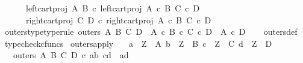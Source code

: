 \begin{isabellebody}
\ \ \ \ \ \ left{\isacharunderscore}{\kern0pt}cart{\isacharunderscore}{\kern0pt}proj\ A\ B\ {\isasymcirc}\isactrlsub c\ left{\isacharunderscore}{\kern0pt}cart{\isacharunderscore}{\kern0pt}proj\ {\isacharparenleft}{\kern0pt}A\ {\isasymtimes}\isactrlsub c\ B{\isacharparenright}{\kern0pt}\ {\isacharparenleft}{\kern0pt}C\ {\isasymtimes}\isactrlsub c\ D{\isacharparenright}{\kern0pt}{\isacharcomma}{\kern0pt}\isanewline
\ \ \ \ \ \ right{\isacharunderscore}{\kern0pt}cart{\isacharunderscore}{\kern0pt}proj\ C\ D\ {\isasymcirc}\isactrlsub c\ right{\isacharunderscore}{\kern0pt}cart{\isacharunderscore}{\kern0pt}proj\ {\isacharparenleft}{\kern0pt}A\ {\isasymtimes}\isactrlsub c\ B{\isacharparenright}{\kern0pt}\ {\isacharparenleft}{\kern0pt}C\ {\isasymtimes}\isactrlsub c\ D{\isacharparenright}{\kern0pt}\isanewline
\ \ \ \ {\isasymrangle}{\isachardoublequoteclose}\isanewline
\isanewline
{}\isamarkupfalse%
\ outers{\isacharunderscore}{\kern0pt}type{\isacharbrackleft}{\kern0pt}type{\isacharunderscore}{\kern0pt}rule{\isacharbrackright}{\kern0pt}{\isacharcolon}{\kern0pt}\ {\isachardoublequoteopen}outers\ A\ B\ C\ D\ {\isacharcolon}{\kern0pt}\ {\isacharparenleft}{\kern0pt}A\ {\isasymtimes}\isactrlsub c\ B{\isacharparenright}{\kern0pt}\ {\isasymtimes}\isactrlsub c\ {\isacharparenleft}{\kern0pt}C\ {\isasymtimes}\isactrlsub c\ D{\isacharparenright}{\kern0pt}\ {\isasymrightarrow}\ {\isacharparenleft}{\kern0pt}A\ {\isasymtimes}\isactrlsub c\ D{\isacharparenright}{\kern0pt}{\isachardoublequoteclose}\isanewline
%
\isadelimproof
\ \ %
\endisadelimproof
%
\isatagproof
{}\isamarkupfalse%
\ outers{\isacharunderscore}{\kern0pt}def\ \isamarkupfalse%
\ typecheck{\isacharunderscore}{\kern0pt}cfuncs%
\endisatagproof
{\isafoldproof}%
%
\isadelimproof
\isanewline
%
\endisadelimproof
\isanewline
{}\isamarkupfalse%
\ outers{\isacharunderscore}{\kern0pt}apply{\isacharcolon}{\kern0pt}\isanewline
\ \ \ {\isachardoublequoteopen}a\ {\isacharcolon}{\kern0pt}\ Z\ {\isasymrightarrow}\ A{\isachardoublequoteclose}\ {\isachardoublequoteopen}b\ {\isacharcolon}{\kern0pt}\ Z\ {\isasymrightarrow}\ B{\isachardoublequoteclose}\ {\isachardoublequoteopen}c\ {\isacharcolon}{\kern0pt}\ Z\ {\isasymrightarrow}\ C{\isachardoublequoteclose}\ {\isachardoublequoteopen}d\ {\isacharcolon}{\kern0pt}\ Z\ {\isasymrightarrow}\ D{\isachardoublequoteclose}\isanewline
\ \ \ {\isachardoublequoteopen}outers\ A\ B\ C\ D\ {\isasymcirc}\isactrlsub c\ {\isasymlangle}{\isasymlangle}a{\isacharcomma}{\kern0pt}b{\isasymrangle}{\isacharcomma}{\kern0pt}\ {\isasymlangle}c{\isacharcomma}{\kern0pt}d{\isasymrangle}{\isasymrangle}\ {\isacharequal}{\kern0pt}\ {\isasymlangle}a{\isacharcomma}{\kern0pt}d{\isasymrangle}{\isachardoublequoteclose}\isanewline

\end{isabellebody}
